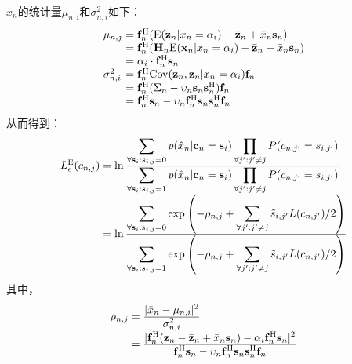 $\hat{x}_n$的统计量$\mu_{n,i}$和$\sigma_{n,i}^2$如下：
\begin{eqnarray}
     \begin{array}{l@{\;=\;}l}
           \mu_{n,j}&\mathbf{f}_n^{\mathrm{H}}(\mathrm{E}(\mathbf{z}_n|x_n=\alpha_i)-\bar{\mathbf{z}}_n+\bar{x}_n\mathbf{s}_n)\\
           &\mathbf{f}_n^{\mathrm{H}}(\mathbf{H}_n\mathrm{E}(\mathbf{x}_n|x_n=\alpha_i)-\bar{\mathbf{z}}_n+\bar{x}_n\mathbf{s}_n)\\
           &\alpha_i\cdot\mathbf{f}^{\mathrm{H}}_n\mathbf{s}_n\\
           \sigma^2_{n,i}&\mathbf{f}^{\mathrm{H}}_n\mathrm{Cov}(\mathbf{z}_n,\mathbf{z}_n|x_n=\alpha_i)\mathbf{f}_n\\
           &\mathbf{f}_n^{\mathrm{H}}(\Sigma_n-\upsilon_n\mathbf{s}_n\mathbf{s}_n^{\mathrm{H}})\mathbf{f}_n\\
           &\mathbf{f}_n^{\mathrm{H}}\mathbf{s}_n-\upsilon_n\mathbf{f}_n^{\mathrm{H}}\mathbf{s}_n\mathbf{s}_n^{\mathrm{H}}\mathbf{f}_n
       \end{array}
           \label{equ:3.20}
\end{eqnarray}
从而得到：
\begin{eqnarray}
      \begin{array}{l@{\;=\;}l}
          L_e^{\mathrm{E}}(c_{n,j})& \ln\frac{\displaystyle\sum_{\forall \mathbf{s}_i:s_{i,j}=0}p(\hat{x}_n|\mathbf{c}_n=\mathbf{s}_i)\prod_{\forall {j}':{j}'\neq j}P(c_{n,{j}'}=s_{i,{j}'})}{\displaystyle\sum_{\forall \mathbf{s}_i:s_{i,j}=1}p(\hat{x}_n|\mathbf{c}_n=\mathbf{s}_i)\prod_{\forall {j}':{j}'\neq j}P(c_{n,{j}'}=s_{i,{j}'})}\\
        & \ln\frac{\displaystyle\sum_{\forall
         \mathbf{s}_i:s_{i,j}=0}\exp\left(-\rho_{n,j}+\sum_{\forall
         {j}':{j}'\neq j}\tilde{s}_{i,{j}'}L(c_{n,{j}'})/2\right
         )}{\displaystyle\sum_{\forall \mathbf{s}_i:s_{i,j}=1}\exp\left(-\rho_{n,j}+\sum_{\forall {j}':{j}'\neq j}\tilde{s}_{i,{j}'}L(c_{n,{j}'})/2\right)}\\
    \end{array}
    \label{equ:3.21}
\end{eqnarray}
其中，
\begin{eqnarray}
    \begin{array}{l@{\;=\;}l}
     \rho_{n,j}&\frac{\displaystyle|\bar{x}_n-\mu_{n,i}|^2}{\displaystyle\sigma^2_{n,i}}\\
     &\frac{\displaystyle|\mathbf{f}^{\mathrm{H}}_n(\mathbf{z}_n-\bar{\mathbf{z}}_n+\bar{x}_n\mathbf{s}_n)-\alpha_i\mathbf{f}^{\mathrm{H}}_n\mathbf{s}_n|^2}{\displaystyle\mathbf{f}^{\mathrm{H}}_n\mathbf{s}_n-\upsilon_n\mathbf{f}^{\mathrm{H}}_n\mathbf{s}_n\mathbf{s}_n^{\mathrm{H}}\mathbf{f}_n}
 \end{array} 
    \label{equ:3.22}
\end{eqnarray}

